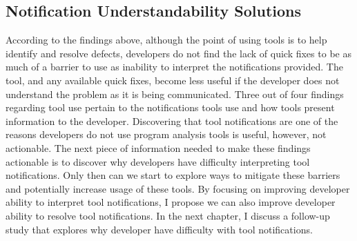 
\subsection{Notification Understandability Solutions}
According to the findings above, although the point of using tools is to help identify and resolve defects, developers do not find the lack of quick fixes to be as much of a barrier to use as inability to interpret the notifications provided.
The tool, and any available quick fixes, become less useful if the developer does not understand the problem as it is being communicated.
Three out of four findings regarding tool use pertain to the notifications tools use and how tools present information to the developer.
Discovering that tool notifications are one of the reasons developers do not use program analysis tools is useful, however, not actionable. The next piece of information needed to make these findings actionable is to discover why developers have difficulty interpreting tool notifications. Only then can we start to explore ways to mitigate these barriers and potentially increase usage of these tools.
By focusing on improving developer ability to interpret tool notifications, I propose we can also improve developer ability to resolve tool notifications. In the next chapter, I discuss a follow-up study that explores why developer have difficulty with tool notifications.
